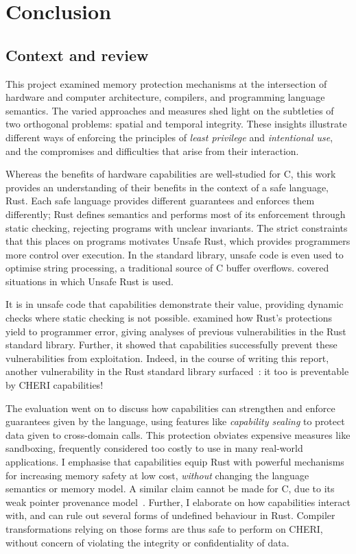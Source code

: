 \documentclass[dissertation.tex]{subfiles}
\begin{document}
\chapter{Conclusion}

\section{Context and review}

This project examined memory protection mechanisms at
the intersection of hardware and computer architecture, compilers, and
programming language semantics.
The varied approaches and measures shed light on the subtleties of
two orthogonal problems: spatial and temporal integrity.
These insights illustrate different ways of enforcing the principles of
\emph{least privilege} and \emph{intentional use}, and the compromises
and difficulties that arise from their interaction.

Whereas the benefits of hardware capabilities are well-studied for C,
this work provides an understanding of their benefits in the context of
a safe language, Rust.
Each safe language provides different guarantees and enforces them
differently; Rust defines semantics and performs most of its enforcement
through static checking, rejecting programs with unclear invariants.
The strict constraints that this places on programs motivates Unsafe
Rust, which provides programmers more control over execution.
In the standard library, unsafe code is even used to optimise string
processing, a traditional source of C buffer overflows.
 covered situations in which
Unsafe Rust is used.

It is in unsafe code that capabilities demonstrate their value,
providing dynamic checks where static checking is not possible.
 examined how Rust's protections yield to
programmer error, giving analyses of previous vulnerabilities in the
Rust standard library.
Further, it showed that capabilities successfully prevent these
vulnerabilities from exploitation.
Indeed, in the course of writing this report, another vulnerability in
the Rust standard library surfaced~\cite{rust-advisory-cast}: it too
is preventable by CHERI capabilities!

The evaluation went on to discuss how capabilities can strengthen and
enforce guarantees given by the language, using features like
\emph{capability sealing} to protect data given to cross-domain calls.
This protection obviates expensive measures like sandboxing, frequently
considered too costly to use in many real-world applications.
I emphasise that capabilities equip Rust with powerful
mechanisms for increasing memory safety at low cost,
\emph{without} changing the language semantics or memory model.
A similar claim cannot be made for C, due to its weak pointer
provenance model~\cite{cheri-2019-abstract}.
Further, I elaborate on how capabilities interact with, and can rule out
several forms of undefined behaviour in Rust.
Compiler transformations relying on those forms are thus safe to
perform on CHERI, without concern of violating the integrity or
confidentiality of data.
\end{document}
